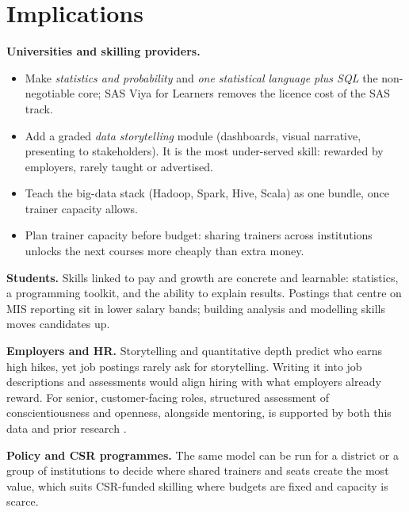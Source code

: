 \section{Implications}\label{sec:implications}

\textbf{Universities and skilling providers.}
\begin{itemize}
  \item Make \emph{statistics and probability} and \emph{one statistical language plus SQL} the
        non-negotiable core; SAS Viya for Learners removes the licence cost of the SAS track.
  \item Add a graded \emph{data storytelling} module (dashboards, visual narrative, presenting to
        stakeholders). It is the most under-served skill: rewarded by employers, rarely taught or
        advertised.
  \item Teach the big-data stack (Hadoop, Spark, Hive, Scala) as one bundle, once trainer capacity
        allows.
  \item Plan trainer capacity before budget: sharing trainers across institutions unlocks the next
        courses more cheaply than extra money.
\end{itemize}

\textbf{Students.} Skills linked to pay and growth are concrete and learnable: statistics, a
programming toolkit, and the ability to explain results. Postings that centre on MIS reporting sit
in lower salary bands; building analysis and modelling skills moves candidates up.

\textbf{Employers and HR.} Storytelling and quantitative depth predict who earns high hikes, yet
job postings rarely ask for storytelling. Writing it into job descriptions and assessments would
align hiring with what employers already reward. For senior, customer-facing roles, structured
assessment of conscientiousness and openness, alongside mentoring, is supported by both this data
and prior research \citep{barrick1991}.

\textbf{Policy and CSR programmes.} The same model can be run for a district or a group of
institutions to decide where shared trainers and seats create the most value, which suits CSR-funded
skilling where budgets are fixed and capacity is scarce.

